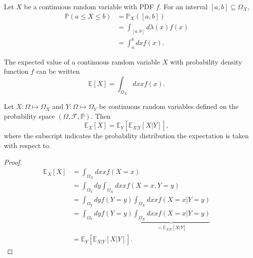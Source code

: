 \begin{example}
	Let $X$ be a continuous random variable with PDF $f$. For an interval $[a,b] \subseteq \Omega_X$,
	\begin{equation}
		\begin{split}
			\mathbb{P}(a \le X \le b) 
			&= \mathbb{P}_X([a,b])\\ 
			&= \int_{[a,b]} d\lambda(x) f(x) \\ 
			&= \int_a^b dx f(x).
		\end{split}
	\end{equation}
\end{example}

\begin{theorem}
	\label{theorem:expectaion_continuous}
	The expected value of a continuous random variable $X$ with probability density function $f$ can be written 
	\begin{equation}
		\mathbb{E}[X]=\int_{\Omega_X} dx xf(x).
	\end{equation}
\end{theorem}
\begin{theorem}
	\label{theorem:total_expectation}
	Let $X: \Omega \mapsto \Omega_X$ and $Y: \Omega \mapsto \Omega_Y$ be continuous random variables defined on the probability space $(\Omega, \mathcal{F}, \mathbb{P})$. Then
	\begin{equation}
		\mathbb{E}_X[X] = \mathbb{E}_Y[\mathbb{E}_{X|Y}[X| Y]],
	\end{equation}
	where the subscript indicates the probability distribution the expectation is taken with respect to.
\end{theorem}
\begin{proof}
	\begin{equation}
		\begin{split}
			\mathbb{E}_X[X] &= \int_{\Omega_X} dx x f(X=x)\\
			& = \int_{\Omega_Y} dy\int_{\Omega_X}dx x f(X=x,Y=y)\\
			& =  \int_{\Omega_Y} dy f(Y=y) \int_{\Omega_X}dx x f(X=x|Y=y)\\
			& =  \int_{\Omega_Y} dy f(Y=y) \underbrace{\int_{\Omega_X}dx x f(X=x|Y=y)}_{= \mathbb{E}_{X|Y}[X|Y]}\\
			& = \mathbb{E}_Y[\mathbb{E}_{X|Y}[X|Y]].
		\end{split}
	\end{equation}
\end{proof}

